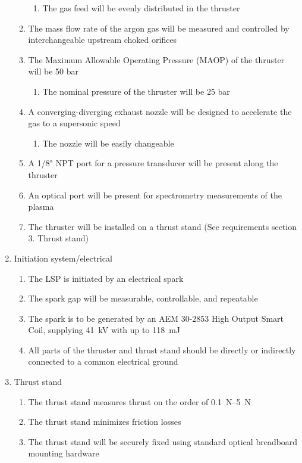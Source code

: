 \begin{enumerate}
\begin{enumerate}
\begin{enumerate}
                        \item The gas feed will be evenly distributed in the thruster
                    \end{enumerate}
                    \item The mass flow rate of the argon gas will be measured and controlled by interchangeable upstream choked orifices
                    \item The Maximum Allowable Operating Pressure (MAOP) of the thruster will be 50 bar
                    \begin{enumerate}
                        \item The nominal pressure of the thruster will be 25 bar
                    \end{enumerate}
                    \item A converging-diverging exhaust nozzle will be designed to accelerate the gas to a supersonic speed
                    \begin{enumerate}
                        \item The nozzle will be easily changeable
                    \end{enumerate}
                    \item A 1/8" NPT port for a pressure transducer will be present along the thruster
                    \item An optical port will be present for spectrometry measurements of the plasma
                    \item The thruster will be installed on a thrust stand (See requirements section 3. Thrust stand)
                \end{enumerate}
                \item Initiation system/electrical
                \begin{enumerate}
                    \item The LSP is initiated by an electrical spark
                    \item The spark gap will be measurable, controllable, and repeatable
                    \item The spark is to be generated by an AEM 30-2853 High Output Smart Coil, supplying \qty{41}{kV} with up to \qty{118}{mJ}
                    \item All parts of the thruster and thrust stand should be directly or indirectly connected to a common electrical ground
                \end{enumerate}
                \item Thrust stand
                \begin{enumerate}
                    \item The thrust stand measures thrust on the order of \qtyrange{0.1}{5}{N}
                    \item The thrust stand minimizes friction losses
                    \item The thrust stand will be securely fixed using standard optical breadboard mounting hardware
                \end{enumerate}
            \end{enumerate}

